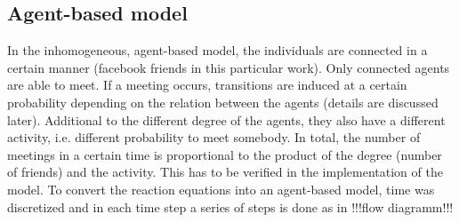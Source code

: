 \subsection{Agent-based model}

In the inhomogeneous, agent-based model, the individuals are connected in a certain manner (facebook friends in this particular work). Only connected agents are able to meet. If a meeting occurs, transitions are induced at a certain probability depending on the relation between the agents (details are discussed later). Additional to the different degree of the agents, they also have a different activity, i.e. different probability to meet somebody. In total, the number of meetings in a certain time is proportional to the product of the degree (number of friends) and the activity. This has to be verified in the implementation of the model.
\newline
\newline
To convert the reaction equations into an agent-based model, time was discretized
and in each time step a series of steps is done as in !!!flow diagramm!!!








